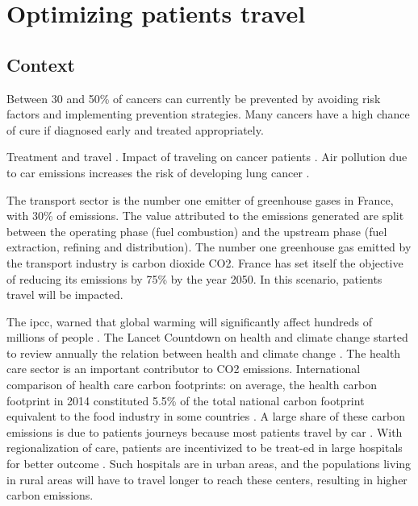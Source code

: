 \chapter{Optimizing patients travel}

\section{Context}

Between 30 and 50\% of cancers can currently be prevented by avoiding risk factors and implementing prevention strategies. Many cancers have a high chance of cure if diagnosed early and treated appropriately.

Treatment and travel \cite{weiss_global_2020,brundisini_chronic_2013,kelly_are_2016,salerno_understanding_2022}.
Impact of traveling on cancer patients \cite{payne_impact_2000,flytkjaer_virgilsen_cancer_2019,virgilsen_travel_2019,payne_impact_2000,ambroggi_distance_2015}.
Air pollution due to car emissions increases the risk of developing lung cancer \cite{raaschou-nielsen_air_2013}.

The transport sector is the number one emitter of greenhouse gases in France, with 30\% of emissions. The value attributed to the emissions generated are split between the operating phase (fuel combustion) and the upstream phase (fuel extraction, refining and distribution). The number one greenhouse gas emitted by the transport industry is carbon dioxide CO2.
France has set itself the objective of reducing its emissions by 75\% by the year 2050. In this scenario, patients travel will be impacted.

The \ac{ipcc}, warned that global warming will significantly affect hundreds of millions of people \cite{change_climate_2015}.
The Lancet Countdown on health and climate change started to review annually the relation between health and climate change \cite{watts_2020_2021}.
The health care sector is an important contributor to CO2 emissions. International comparison of health care carbon footprints: on average, the health carbon footprint in 2014 constituted 5.5\% of the total national carbon footprint equivalent to the food industry in some countries \cite{pichler_international_2019}.
A large share of these carbon emissions is due to patients journeys \cite{andrews_carbon_2013,nicolet_what_2022} because most patients travel by car \cite{forner_carbon_2021}. With regionalization of care, patients are incentivized to be treat-ed in large hospitals for better outcome \cite{eskander_health_2016}. Such hospitals are in urban areas, and the populations living in rural areas will have to travel longer to reach these centers, resulting in higher carbon emissions.

